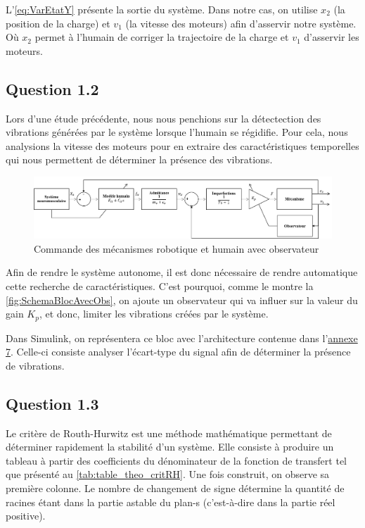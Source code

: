\documentclass[a4paper,12pt]{article}
\begin{document}
    L'\autoref{eq:VarEtatY} présente la sortie du système. Dans notre cas, on utilise $x_2$ (la position de la charge) et $v_1$ (la vitesse des moteurs) afin d'asservir notre système. Où $x_2$ permet à l'humain de corriger la trajectoire de la charge et $v_1$ d'asservir les moteurs.
    
    
    \subsection{Question 1.2}
    Lors d'une étude précédente, nous nous penchions sur la détectection des vibrations générées par le système lorsque l'humain se régidifie. Pour cela, nous analysions la vitesse des moteurs pour en extraire des caractéristiques temporelles qui nous permettent de déterminer la présence des vibrations.   
    \begin{figure}[H]
        \centering
        \includegraphics[width=16cm]{./img/SchemaBlocAvecObs.png}
        \caption{Commande des mécanismes robotique et humain avec observateur\label{fig:SchemaBlocAvecObs}}
    \end{figure}
    
    Afin de rendre le système autonome, il est donc nécessaire de rendre automatique cette recherche de caractéristiques. C'est pourquoi, comme le montre la \autoref{fig:SchemaBlocAvecObs}, on ajoute un observateur qui va influer sur la valeur du gain $K_p$, et donc, limiter les vibrations créées par le système.
    
    Dans Simulink, on représentera ce bloc avec l'architecture contenue dans l'\hyperref[Annexe:modelObs]{annexe 7}. Celle-ci consiste analyser l'écart-type du signal afin de déterminer la présence de vibrations.
    
    
    \subsection{Question 1.3}
    Le critère de Routh-Hurwitz est une méthode mathématique permettant de déterminer rapidement la stabilité d'un système. Elle consiste à produire un tableau à partir des coefficients du dénominateur de la fonction de transfert tel que présenté au \autoref{tab:table_theo_critRH}. Une fois construit, on observe sa première colonne. Le nombre de changement de signe détermine la quantité de racines étant dans la partie astable du plan-s (c'est-à-dire dans la partie réel positive).
    
\end{document}
